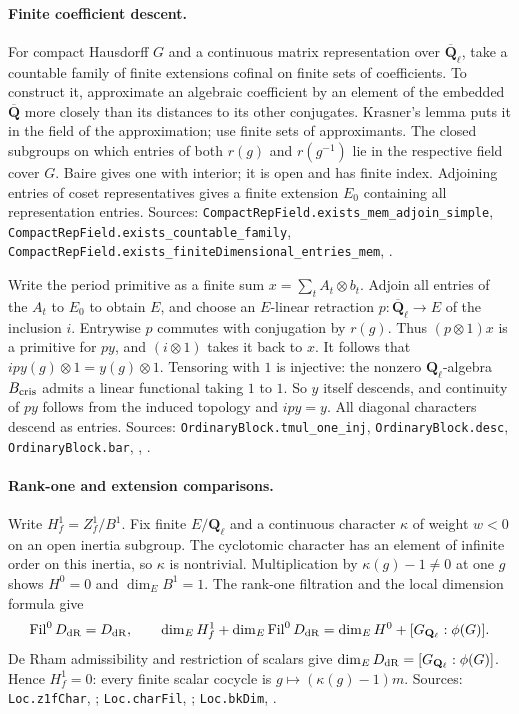 \paragraph{Finite coefficient descent.}
For compact Hausdorff $G$ and a continuous matrix representation over
$\overline{\mathbf Q}_\ell$, take a countable family of finite extensions
cofinal on finite sets of coefficients. To construct it, approximate an
algebraic coefficient by an element of the embedded $\overline{\mathbf Q}$
more closely than its distances to its other conjugates. Krasner's lemma
puts it in the field of the approximation; use finite sets of approximants.
The closed subgroups on which entries of both $r(g)$ and $r(g^{-1})$ lie
in the respective field cover $G$. Baire gives one with interior; it is
open and has finite index. Adjoining entries of coset representatives
gives a finite extension $E_0$ containing all representation entries.
Sources: \nolinkurl{CompactRepField.exists_mem_adjoin_simple},
\nolinkurl{CompactRepField.exists_countable_family},
\nolinkurl{CompactRepField.exists_finiteDimensional_entries_mem},
.

Write the period primitive as a finite sum $x=\sum_t A_t\otimes b_t$.
Adjoin all entries of the $A_t$ to $E_0$ to obtain $E$, and choose an
$E$-linear retraction $p:\overline{\mathbf Q}_\ell\to E$ of the
inclusion $i$. Entrywise $p$ commutes with conjugation by $r(g)$.
Thus $(p\otimes1)x$ is a primitive for $p y$, and $(i\otimes1)$
takes it back to $x$. It follows that
$i p y(g)\otimes1=y(g)\otimes1$. Tensoring with $1$ is injective:
the nonzero $\mathbf Q_\ell$-algebra $B_{\rm cris}$ admits a linear
functional taking $1$ to $1$. So $y$ itself descends, and continuity
of $p y$ follows from the induced topology and $i p y=y$. All
diagonal characters descend as entries. Sources:
\nolinkurl{OrdinaryBlock.tmul_one_inj}, \nolinkurl{OrdinaryBlock.desc},
\nolinkurl{OrdinaryBlock.bar}, ,
.

\paragraph{Rank-one and extension comparisons.}
Write $H_f^1=Z_f^1/B^1$. Fix finite $E/\mathbf Q_\ell$ and a continuous
character $\kappa$ of weight $w<0$ on an open inertia subgroup.
The cyclotomic character has an element of infinite order on this
inertia, so $\kappa$ is nontrivial. Multiplication by
$\kappa(g)-1\ne0$ at one $g$ shows $H^0=0$ and $\dim_E B^1=1$.
The rank-one filtration and the local dimension formula give
\[
 \operatorname{Fil}^0D_{\rm dR}=D_{\rm dR},\qquad
 \dim_E H_f^1+\dim_E\operatorname{Fil}^0D_{\rm dR}
 =\dim_E H^0+[G_{\mathbf Q_\ell}:\phi(G)] .
\]
De Rham admissibility and restriction of scalars give
$\dim_E D_{\rm dR}=[G_{\mathbf Q_\ell}:\phi(G)]$. Hence $H_f^1=0$:
every finite scalar cocycle is $g\mapsto(\kappa(g)-1)m$.
Sources: \nolinkurl{Loc.z1fChar}, ;
\nolinkurl{Loc.charFil}, ;
\nolinkurl{Loc.bkDim}, .

